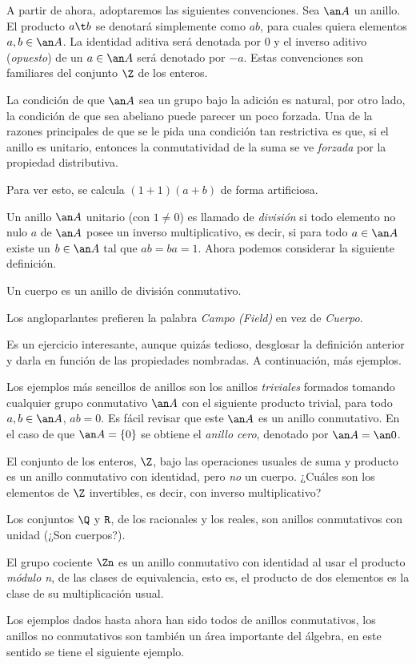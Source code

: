 A partir de ahora, adoptaremos las siguientes convenciones. Sea $\an A$ un anillo. El producto $a\t b$ se denotará simplemente como $ab$, para cuales quiera elementos $a,b \in\an A$. La identidad aditiva será denotada por $0$ y el inverso aditivo (\textit{opuesto}) de un $a \in\an A$ será denotado por $-a$. Estas convenciones son familiares del conjunto $\Z$ de los enteros.

 La condición de que $\an A$ sea un grupo bajo la adición es natural, por otro lado, la condición de que sea abeliano puede parecer un poco forzada. Una de la razones principales de que se le pida una condición tan restrictiva es que, si el anillo es unitario, entonces la conmutatividad de la suma se ve \textit{forzada} por la propiedad distributiva. 

\begin{nota}
	Para ver esto, se calcula $(1+1)(a+b)$ de forma artificiosa.
\end{nota}
%
 Un anillo $\an A$ unitario (con $1 \neq 0$) es llamado de \textit{división} si todo elemento no nulo $a$ de $\an A$ posee un inverso multiplicativo, es decir, si para todo $a \in\an A$ existe un $b \in\an A$ tal que $ab = ba = 1$. Ahora podemos considerar la siguiente definición. 

\begin{defi}[cuerpo]  
	Un cuerpo es un anillo de división conmutativo.
\end{defi} 
\begin{nota}
	Los angloparlantes prefieren la palabra \textit{Campo (Field)} en vez de \textit{Cuerpo}.
\end{nota}
Es un ejercicio interesante, aunque quizás tedioso, desglosar la definición anterior y darla en función de las propiedades nombradas. A continuación, más ejemplos.
\begin{ejem}
	Los ejemplos más sencillos de anillos son los anillos \textit{triviales} formados tomando cualquier grupo conmutativo $\an A$ con el siguiente producto trivial, para todo $a,b \in\an A$, $ab=0$. Es fácil revisar que este $\an A$ es un anillo conmutativo. En el caso de que $\an A=\{0\}$ se obtiene el \textit{anillo cero}, denotado por $\an A=\an0$. 
\end{ejem}
\begin{ejem} 
	El conjunto de los enteros, $\Z$, bajo las operaciones usuales de suma y producto es un anillo conmutativo con identidad, pero \textit{no} un cuerpo. ¿Cuáles son los elementos de $\Z$ invertibles, es decir, con inverso multiplicativo?
\end{ejem}
\begin{ejem}
	Los conjuntos $\Q$ y $\texttt{R}$, de los racionales y los reales, son anillos conmutativos con unidad (¿Son cuerpos?). 
\end{ejem}
\begin{ejem}
	El grupo cociente $\Zn$ es un anillo conmutativo con identidad al usar el producto \textit{módulo n}, de las clases de equivalencia, esto es, el producto de dos elementos es la clase de su multiplicación usual. 
\end{ejem} 
%
Los ejemplos dados hasta ahora han sido todos de anillos conmutativos, los anillos no conmutativos son también un área importante del álgebra, en este sentido se tiene el siguiente ejemplo. 

